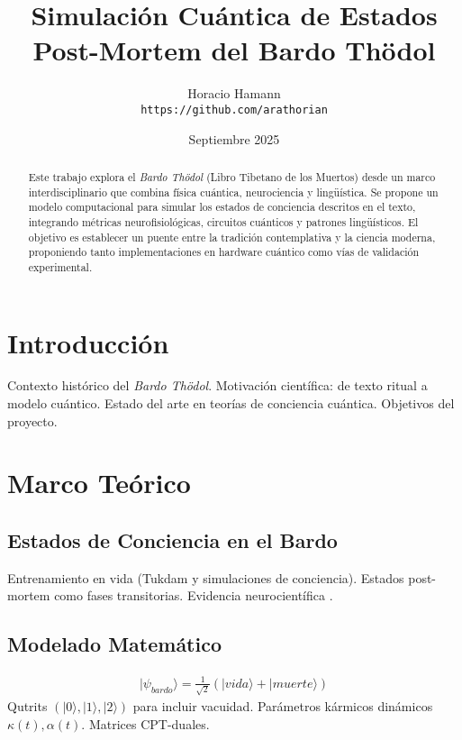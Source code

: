 \documentclass[12pt,a4paper]{article}
\title{\textbf{Simulación Cuántica de Estados Post-Mortem del Bardo Thödol}}
\author{Horacio Hamann \\ \texttt{https://github.com/arathorian}}
\date{Septiembre 2025}
\begin{document}
\maketitle

\begin{abstract}
Este trabajo explora el \emph{Bardo Thödol} (Libro Tibetano de los Muertos) 
desde un marco interdisciplinario que combina física cuántica, neurociencia 
y lingüística. Se propone un modelo computacional para simular los estados 
de conciencia descritos en el texto, integrando métricas neurofisiológicas, 
circuitos cuánticos y patrones lingüísticos. El objetivo es establecer un 
puente entre la tradición contemplativa y la ciencia moderna, proponiendo 
tanto implementaciones en hardware cuántico como vías de validación experimental.
\end{abstract}

\tableofcontents

\section{Introducción}
Contexto histórico del \emph{Bardo Thödol}. Motivación científica: de texto 
ritual a modelo cuántico. Estado del arte en teorías de conciencia cuántica. 
Objetivos del proyecto.

\section{Marco Teórico}

\subsection{Estados de Conciencia en el Bardo}
Entrenamiento en vida (Tukdam y simulaciones de conciencia). Estados post-mortem 
como fases transitorias. Evidencia neurocientífica \cite{wisconsin2022gamma, mindlife2023tukdam}.

\subsection{Modelado Matemático}
\begin{align}
| \psi_{bardo} \rangle = \frac{1}{\sqrt{2}} (|vida\rangle + |muerte\rangle)
\end{align}
Qutrits $(|0\rangle, |1\rangle, |2\rangle)$ para incluir vacuidad. 
Parámetros kármicos dinámicos $\kappa(t), \alpha(t)$. 
Matrices CPT-duales.
\end{document}
